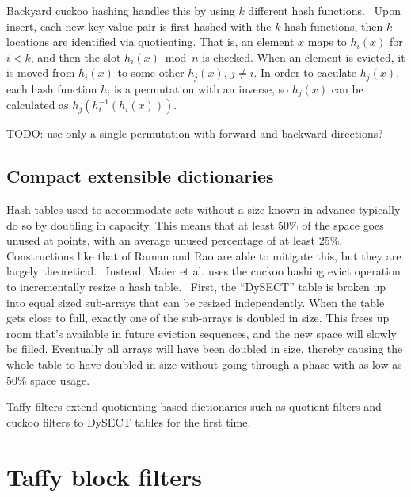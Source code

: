 \documentclass[sigconf, nonacm]{acmart}
\begin{document}

Backyard cuckoo hashing handles this by using $k$ different hash functions.~\cite{backyard}
Upon insert, each new key-value pair is first hashed with the $k$ hash functions, then $k$ locations are identified via quotienting.
That is, an element $x$ maps to $h_i(x)$ for $i < k$, and then the slot $h_i(x) \bmod n$ is checked.
When an element is evicted, it is moved from $h_i(x)$ to some other $h_j(x)$, $j \ne i$.
In order to caculate $h_j(x)$, each hash function $h_i$ is a permutation with an inverse, so $h_j(x)$ can be calculated as $h_j(h_i^{-1}(h_i(x)))$.

TODO: use only a single permutation with forward and backward directions?



\subsection{Compact extensible dictionaries}

Hash tables used to accommodate sets without a size known in advance typically do so by doubling in capacity.
This means that at least 50\% of the space goes unused at points, with an average unused percentage of at least 25\%.
Constructions like that of Raman and Rao are able to mitigate this, but they are largely theoretical.~\cite{succinct}
Instead, Maier et al. uses the cuckoo hashing evict operation to incrementally resize a hash table.~\cite{dysect}
First, the ``DySECT'' table is broken up into equal sized sub-arrays that can be resized independently.
When the table gets close to full, exactly one of the sub-arrays is doubled in size.
This frees up room that's available in future eviction sequences, and the new space will slowly be filled.
Eventually all arrays will have been doubled in size, thereby causing the whole table to have doubled in size without going through a phase with as low as 50\% space usage.

Taffy filters extend quotienting-based dictionaries such as quotient filters and cuckoo filters to DySECT tables for the first time.

\section{Taffy block filters}
\label{pbf}
\end{document}
